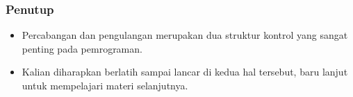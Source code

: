 \documentclass{beamer}
\begin{document}
\begin{frame}
\frametitle{Penutup}
\begin{itemize}
	\item Percabangan dan pengulangan merupakan dua struktur kontrol yang sangat penting pada pemrograman.
	\item Kalian diharapkan berlatih sampai lancar di kedua hal tersebut, baru lanjut untuk mempelajari materi selanjutnya.
\end{itemize}
\end{frame}
\end{document}
